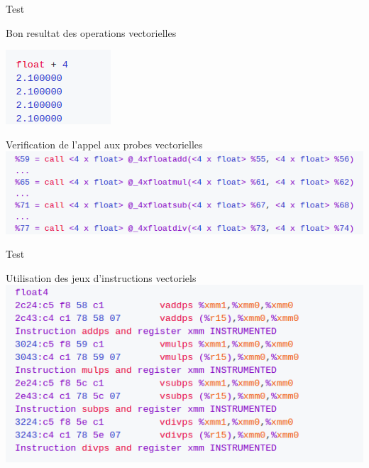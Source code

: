 \documentclass{beamer}
\begin{document}
\begin{frame}{Test}

  \begin{block}{Bon resultat des operations vectorielles}
    

  \centering\includegraphics[scale=0.8]{../ressources/bon_resultat.png}

    
  \end{block}

  \begin{block}{Verification de l'appel aux probes vectorielles}
\centering\includegraphics[scale=0.5]{../ressources/appel_des_fonction.png}
  \end{block}
\end{frame}

\begin{frame}{Test}

\begin{block}{Utilisation des jeux d'instructions vectoriels}
\centering\includegraphics[scale=0.5]{../ressources/ajout_instructions.png}
  \end{block}
\end{frame}
\end{document}
